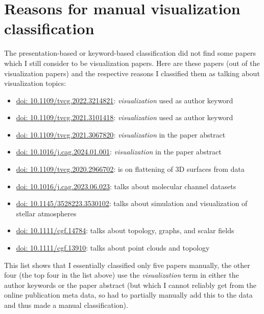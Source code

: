 \documentclass[conference]{vgtc}                     %
\begin{document}
\section{Reasons for manual visualization classification}
\label{app:manual-reasons}

The presentation-based or keyword-based classification did not find some papers which I still consider to be visualization papers. Here are these \GrsiVisManuallyMarkedPapersCount{} papers (out of the \GrsiTotalVisPapers{} visualization papers) and the respective reasons I classified them as talking about visualization topics:
\begin{itemize}
\item \href{https://doi.org/10.1109/tvcg.2022.3214821}{doi: 10.1109/tvcg.2022.3214821}: \emph{visualization} used as author keyword
\item \href{https://doi.org/10.1109/tvcg.2021.3101418}{doi: 10.1109/tvcg.2021.3101418}: \emph{visualization} used as author keyword
\item \href{https://doi.org/10.1109/tvcg.2021.3067820}{doi: 10.1109/tvcg.2021.3067820}: \emph{visualization} in the paper abstract
\item \href{https://doi.org/10.1016/j.cag.2024.01.001}{doi: 10.1016/j.cag.2024.01.001}: \emph{visualization} in the paper abstract
\item \href{https://doi.org/10.1109/tvcg.2020.2966702}{doi: 10.1109/tvcg.2020.2966702}: is on flattening of 3D surfaces from data
\item \href{https://doi.org/10.1016/j.cag.2023.06.023}{doi: 10.1016/j.cag.2023.06.023}: talks about molecular channel datasets
\item \href{https://doi.org/10.1145/3528223.3530102}{doi: 10.1145/3528223.3530102}: talks about simulation and visualization of stellar atmospheres
\item \href{https://doi.org/10.1111/cgf.14784}{doi: 10.1111/cgf.14784}: talks about topology, graphs, and scalar fields
\item \href{https://doi.org/10.1111/cgf.13910}{doi: 10.1111/cgf.13910}: talks about point clouds and topology
\end{itemize}
This list shows that I essentially classified only five papers manually, the other four (the top four in the list above) use the \emph{visualization} term in either the author keywords or the paper abstract (but which I cannot reliably get from the online publication meta data, so had to partially manually add this to the data and thus made a manual classification).
\end{document}
